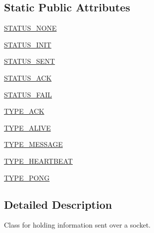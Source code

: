 \subsection*{Static Public Attributes}
\begin{DoxyCompactItemize}
\item 
\hyperlink{classparlai_1_1mturk_1_1core_1_1legacy__2018_1_1socket__manager_1_1Packet_af46b9a88579edaf32a0b8e626c8d523e}{S\+T\+A\+T\+U\+S\+\_\+\+N\+O\+NE}
\item 
\hyperlink{classparlai_1_1mturk_1_1core_1_1legacy__2018_1_1socket__manager_1_1Packet_a2a37895ff804d002beb4ea7b48829427}{S\+T\+A\+T\+U\+S\+\_\+\+I\+N\+IT}
\item 
\hyperlink{classparlai_1_1mturk_1_1core_1_1legacy__2018_1_1socket__manager_1_1Packet_ab1b04bb3c1f770ae522ac5d9f822b98f}{S\+T\+A\+T\+U\+S\+\_\+\+S\+E\+NT}
\item 
\hyperlink{classparlai_1_1mturk_1_1core_1_1legacy__2018_1_1socket__manager_1_1Packet_aabafef31d681a7bd0268ba8d5289bab7}{S\+T\+A\+T\+U\+S\+\_\+\+A\+CK}
\item 
\hyperlink{classparlai_1_1mturk_1_1core_1_1legacy__2018_1_1socket__manager_1_1Packet_a3b696126c0aaee27581967e03d511f82}{S\+T\+A\+T\+U\+S\+\_\+\+F\+A\+IL}
\item 
\hyperlink{classparlai_1_1mturk_1_1core_1_1legacy__2018_1_1socket__manager_1_1Packet_a81a78c4932921fb61d5f1d33c3952709}{T\+Y\+P\+E\+\_\+\+A\+CK}
\item 
\hyperlink{classparlai_1_1mturk_1_1core_1_1legacy__2018_1_1socket__manager_1_1Packet_a022d81b7a7f15d08fde5fb5717e01cda}{T\+Y\+P\+E\+\_\+\+A\+L\+I\+VE}
\item 
\hyperlink{classparlai_1_1mturk_1_1core_1_1legacy__2018_1_1socket__manager_1_1Packet_aa124f03d799cc04a41932453de111e0d}{T\+Y\+P\+E\+\_\+\+M\+E\+S\+S\+A\+GE}
\item 
\hyperlink{classparlai_1_1mturk_1_1core_1_1legacy__2018_1_1socket__manager_1_1Packet_ae0bc619110e8d8730236d39fadff5df0}{T\+Y\+P\+E\+\_\+\+H\+E\+A\+R\+T\+B\+E\+AT}
\item 
\hyperlink{classparlai_1_1mturk_1_1core_1_1legacy__2018_1_1socket__manager_1_1Packet_a49217d7e4654292f8cbfb0249d740b3e}{T\+Y\+P\+E\+\_\+\+P\+O\+NG}
\end{DoxyCompactItemize}


\subsection{Detailed Description}
\begin{DoxyVerb}Class for holding information sent over a socket.
\end{DoxyVerb}
 

